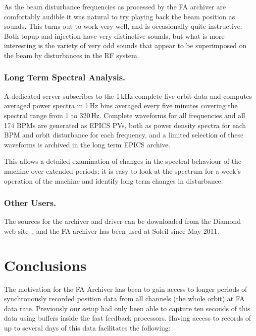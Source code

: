 \documentclass{JAC2003}
\begin{document}
As the beam disturbance frequencies as processed by the FA archiver are
comfortably audible it was natural to try playing back the beam position as
sounds.  This turns out to work very well, and is occasionally quite
instructive.  Both topup and injection have very distinctive sounds, but what is
more interesting is the variety of very odd sounds that appear to be
superimposed on the beam by disturbances in the RF system.

\subsubsection{Long Term Spectral Analysis.}

A dedicated server subscribes to the 1\,kHz complete live orbit data and
computes averaged power spectra in 1\,Hz bins averaged every five minutes
covering the spectral range from 1 to 320\,Hz.  Complete waveforms for all
frequencies and all 174 BPMs are generated as EPICS PVs, both as power density
spectra for each BPM and orbit disturbance for each frequency, and a limited
selection of these waveforms is archived in the long term EPICS archive.

This allows a detailed examination of changes in the spectral behaviour of the
machine over extended periods; it is easy to look at the
spectrum for a week's operation of the machine and identify long term changes in
disturbance.

\subsubsection{Other Users.}

The sources for the archiver and driver can be downloaded from the Diamond web
site~\cite{download}, and the FA archiver has been used at Soleil since May
2011.


\section{Conclusions}

The motivation for the FA Archiver has been to gain access to longer periods of
synchronously recorded position data from all channels (the whole orbit) at FA
data rate. Previously our setup had only been able to capture ten seconds of
this data using buffers inside the fast feedback processors.  Having access to
records of up to several days of this data facilitates the following:
\end{document}
